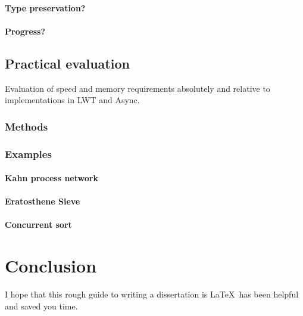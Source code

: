 \documentclass[12pt,twoside,notitlepage]{report}
\begin{document}
\subsubsection{Type preservation?}
\subsubsection{Progress?} 

\section{Practical evaluation}
Evaluation of speed and memory requirements absolutely and relative to implementations in LWT and Async.
\subsection{Methods}
\subsection{Examples}
\subsubsection{Kahn process network}
\subsubsection{Eratosthene Sieve}
\subsubsection{Concurrent sort}
%

\cleardoublepage
\chapter{Conclusion}

I hope that this rough guide to writing a dissertation is \LaTeX\ has
been helpful and saved you time.




\cleardoublepage



\cleardoublepage
\end{document}

